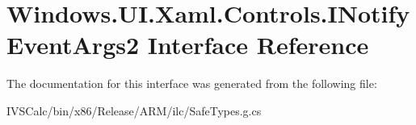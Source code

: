\hypertarget{interface_windows_1_1_u_i_1_1_xaml_1_1_controls_1_1_i_notify_event_args2}{}\section{Windows.\+U\+I.\+Xaml.\+Controls.\+I\+Notify\+Event\+Args2 Interface Reference}
\label{interface_windows_1_1_u_i_1_1_xaml_1_1_controls_1_1_i_notify_event_args2}


The documentation for this interface was generated from the following file\+:\begin{DoxyCompactItemize}
\item 
I\+V\+S\+Calc/bin/x86/\+Release/\+A\+R\+M/ilc/Safe\+Types.\+g.\+cs\end{DoxyCompactItemize}
